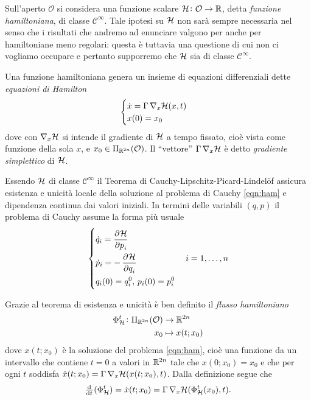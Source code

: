 Sull'aperto $ \mathcal{O} $ si considera una funzione scalare $ \mathcal{H} \colon \mathcal{O} \to \mathbb{R} $, detta \emph{funzione hamiltoniana}, di classe $ \mathcal{C}^{\infty} $. Tale ipotesi su $ \mathcal{H} $ non sarà sempre necessaria nel senso che i risultati che andremo ad enunciare valgono per anche per hamiltoniane meno regolari: questa è tuttavia una questione di cui non ci vogliamo occupare e pertanto supporremo che $ \mathcal{H} $ sia di classe $ \mathcal{C}^\infty $.

Una funzione hamiltoniana genera un insieme di equazioni differenziali dette \emph{equazioni di Hamilton}
\begin{equation} \label{eqn:ham}
    \begin{cases}
    \dot{x} = \Gamma \, \nabla_x \mathcal{H}(x, t) \\
    x(0) = x_0
    \end{cases}
\end{equation}
dove con $ \nabla_x \mathcal{H} $ si intende il gradiente di $ \mathcal{H} $ a tempo fissato, cioè vista come funzione della sola $ x $, e $ x_0 \in \Pi_{\mathbb{R}^{2n}}(\mathcal{O}) $. Il ``vettore'' $ \Gamma \, \nabla_x \mathcal{H} $ è detto \emph{gradiente simplettico} di $ \mathcal{H} $.

Essendo $ \mathcal{H} $ di classe $ \mathcal{C}^\infty $ il Teorema di Cauchy-Lipschitz-Picard-Lindelöf assicura esistenza e unicità locale della soluzione al problema di Cauchy \eqref{eqn:ham} e dipendenza continua dai valori iniziali. In termini delle variabili $ (q, p) $ il problema di Cauchy assume la forma più usuale
\begin{equation}
    \begin{dcases}
        \dot{q}_i = \dpd{\ham}{p_i} \\
        \dot{p}_i = -\dpd{\ham}{q_i} \\
        q_i(0) = q_{i}^0, \, p_i(0) = p_i^0 \\
    \end{dcases}
    \quad i = 1, \ldots, n
\end{equation}

Grazie al teorema di esistenza e unicità è ben definito il \emph{flusso hamiltoniano}
\begin{align}
    \Phi_{\mathcal{H}}^t \colon \Pi_{\mathbb{R}^{2n}}(\mathcal{O}) & \to \mathbb{R}^{2n} \\
    x_0 & \mapsto x(t; x_0)
\end{align}
dove $ x(t; x_0) $ è la soluzione del problema \eqref{eqn:ham}, cioè una funzione da un intervallo che contiene $ t=0 $ a valori in $ \mathbb{R}^{2n} $ tale che $ x(0; x_0) = x_0 $ e che per ogni $ t $ soddisfa $ \dot{x}(t; x_0) = \Gamma \, \nabla_x \mathcal{H}(x(t; x_0), t) $. Dalla definizione segue che
\[
    \od{}{t} (\Phi^t_\ham) = \dot{x}(t; x_0) = \Gamma \, \nabla_x \ham(\Phi_\ham^t(x_0), t).
\]

